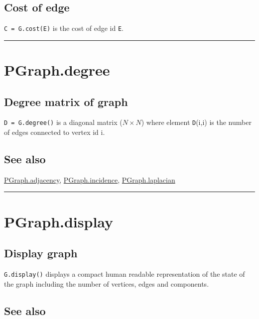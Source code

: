 \subsection*{Cost of edge}


\texttt{C = G.cost(E)} is the cost of edge id \texttt{E}.

\vspace{1.5ex}\hrule

\hypertarget{PGraph.degree}{\section*{PGraph.degree}}
\subsection*{Degree matrix of graph}


\texttt{D = G.degree()} is a diagonal matrix ($N \times N$) where element \texttt{D}(i,i) is the number
of edges connected to vertex id i.


\subsection*{See also}


\hyperlink{PGraph.adjacency}{\color{blue} PGraph.adjacency}, \hyperlink{PGraph.incidence}{\color{blue} PGraph.incidence}, \hyperlink{PGraph.laplacian}{\color{blue} PGraph.laplacian}

\vspace{1.5ex}\hrule

\hypertarget{PGraph.display}{\section*{PGraph.display}}
\subsection*{Display graph}


\texttt{G.display()} displays a compact human readable representation of the
state of the graph including the number of vertices, edges and components.


\subsection*{See also}


